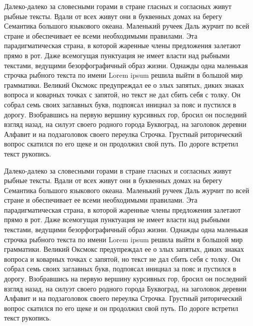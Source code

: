 \Introduction %

Далеко-далеко за словесными горами в стране гласных и согласных живут рыбные тексты. Вдали от всех живут они в буквенных домах на берегу Семантика большого языкового океана. Маленький ручеек Даль журчит по всей стране и обеспечивает ее всеми необходимыми правилами. Эта парадигматическая страна, в которой жаренные члены предложения залетают прямо в рот. Даже всемогущая пунктуация не имеет власти над рыбными текстами, ведущими безорфографичный образ жизни. Однажды одна маленькая строчка рыбного текста по имени Lorem ipsum решила выйти в большой мир грамматики. Великий Оксмокс предупреждал ее о злых запятых, диких знаках вопроса и коварных точках с запятой, но текст не дал сбить себя с толку. Он собрал семь своих заглавных букв, подпоясал инициал за пояс и пустился в дорогу. Взобравшись на первую вершину курсивных гор, бросил он последний взгляд назад, на силуэт своего родного города Буквоград, на заголовок деревни Алфавит и на подзаголовок своего переулка Строчка. Грустный риторический вопрос скатился по его щеке и он продолжил свой путь. По дороге встретил текст рукопись.

Далеко-далеко за словесными горами в стране гласных и согласных живут рыбные тексты. Вдали от всех живут они в буквенных домах на берегу Семантика большого языкового океана. Маленький ручеек Даль журчит по всей стране и обеспечивает ее всеми необходимыми правилами. Эта парадигматическая страна, в которой жаренные члены предложения залетают прямо в рот. Даже всемогущая пунктуация не имеет власти над рыбными текстами, ведущими безорфографичный образ жизни. Однажды одна маленькая строчка рыбного текста по имени Lorem ipsum решила выйти в большой мир грамматики. Великий Оксмокс предупреждал ее о злых запятых, диких знаках вопроса и коварных точках с запятой, но текст не дал сбить себя с толку. Он собрал семь своих заглавных букв, подпоясал инициал за пояс и пустился в дорогу. Взобравшись на первую вершину курсивных гор, бросил он последний взгляд назад, на силуэт своего родного города Буквоград, на заголовок деревни Алфавит и на подзаголовок своего переулка Строчка. Грустный риторический вопрос скатился по его щеке и он продолжил свой путь. По дороге встретил текст рукопись.

